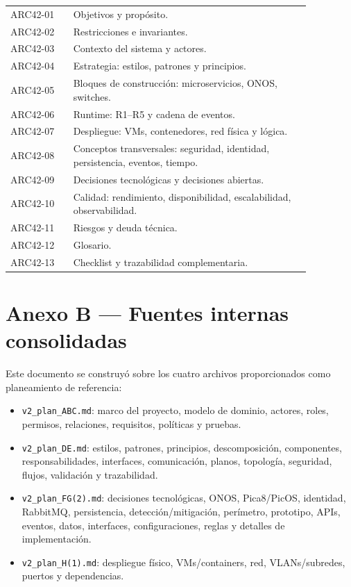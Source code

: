 \documentclass[11pt,a4paper]{article}
\begin{document}
\begin{longtable}{p{0.18\linewidth}p{0.68\linewidth}}
\toprule
ARC42-01 & Objetivos y propósito.\\
ARC42-02 & Restricciones e invariantes.\\
ARC42-03 & Contexto del sistema y actores.\\
ARC42-04 & Estrategia: estilos, patrones y principios.\\
ARC42-05 & Bloques de construcción: microservicios, ONOS, switches.\\
ARC42-06 & Runtime: R1--R5 y cadena de eventos.\\
ARC42-07 & Despliegue: VMs, contenedores, red física y lógica.\\
ARC42-08 & Conceptos transversales: seguridad, identidad, persistencia, eventos, tiempo.\\
ARC42-09 & Decisiones tecnológicas y decisiones abiertas.\\
ARC42-10 & Calidad: rendimiento, disponibilidad, escalabilidad, observabilidad.\\
ARC42-11 & Riesgos y deuda técnica.\\
ARC42-12 & Glosario.\\
ARC42-13 & Checklist y trazabilidad complementaria.\\
\bottomrule
\end{longtable}

\section{Anexo B --- Fuentes internas consolidadas}

Este documento se construyó sobre los cuatro archivos proporcionados como planeamiento de referencia:

\begin{itemize}
\item \texttt{v2\_plan\_ABC.md}: marco del proyecto, modelo de dominio, actores, roles, permisos, relaciones, requisitos, políticas y pruebas.
\item \texttt{v2\_plan\_DE.md}: estilos, patrones, principios, descomposición, componentes, responsabilidades, interfaces, comunicación, planos, topología, seguridad, flujos, validación y trazabilidad.
\item \texttt{v2\_plan\_FG(2).md}: decisiones tecnológicas, ONOS, Pica8/PicOS, identidad, RabbitMQ, persistencia, detección/mitigación, perímetro, prototipo, APIs, eventos, datos, interfaces, configuraciones, reglas y detalles de implementación.
\item \texttt{v2\_plan\_H(1).md}: despliegue físico, VMs/containers, red, VLANs/subredes, puertos y dependencias.
\end{itemize}
\end{document}
